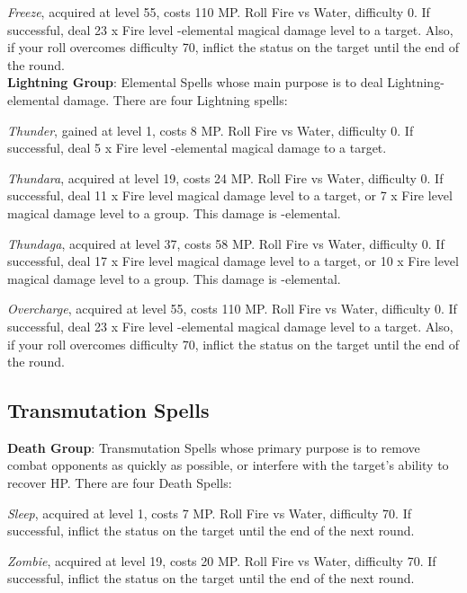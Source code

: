 \begin{multicols}{2}
    \textit{Freeze}, acquired at level 55, costs 110 MP\@. Roll Fire vs Water, difficulty 0. If successful, deal 23 x Fire level -elemental magical damage level to a target. Also, if your roll overcomes difficulty 70, inflict the  status on the target until the end of the round.\\%
    
    \textbf{Lightning Group}: Elemental Spells whose main purpose is to deal Lightning-elemental damage. There are four Lightning spells:
    
    \textit{Thunder}, gained at level 1, costs 8 MP\@. Roll Fire vs Water, difficulty 0. If successful, deal 5 x Fire level -elemental magical damage to a target.
    
    \textit{Thundara}, acquired at level 19, costs 24 MP\@. Roll Fire vs Water, difficulty 0. If successful, deal 11 x Fire level magical damage level to a target, or 7 x Fire level magical damage level to a group. This damage is -elemental.
    
    \textit{Thundaga}, acquired at level 37, costs 58 MP\@. Roll Fire vs Water, difficulty 0. If successful, deal 17 x Fire level magical damage level to a target, or 10 x Fire level magical damage level to a group. This damage is -elemental.
    
    \textit{Overcharge}, acquired at level 55, costs 110 MP\@. Roll Fire vs Water, difficulty 0. If successful, deal 23 x Fire level -elemental magical damage level to a target. Also, if your roll overcomes difficulty 70, inflict the  status on the target until the end of the round.
    
    \subsection{Transmutation Spells}\label{subsec:black-transmutation}

    \textbf{Death Group}: Transmutation Spells whose primary purpose is to remove combat opponents as quickly as possible, or interfere with the target's ability to recover HP\@. There are four Death Spells:
    
    \textit{Sleep}, acquired at level 1, costs 7 MP\@. Roll Fire vs Water, difficulty 70. If successful, inflict the  status on the target until the end of the next round.
    
    \textit{Zombie}, acquired at level 19, costs 20 MP\@. Roll Fire vs Water, difficulty 70. If successful, inflict the  status on the target until the end of the next round.
    

\end{multicols}
